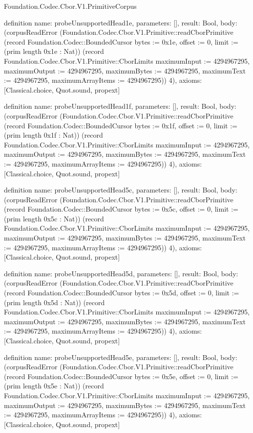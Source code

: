 \begin{lexlean}{Foundation.Codec.Cbor.V1.PrimitiveCorpus}
\begin{semanticmodule}
definition{
  name: probeUnsupportedHead1e,
  parameters: [],
  result: Bool,
  body: (corpusReadError (Foundation.Codec.Cbor.V1.Primitive::readCborPrimitive (record Foundation.Codec::BoundedCursor {bytes := 0x1e, offset := 0, limit := (prim length 0x1e : Nat)}) (record Foundation.Codec.Cbor.V1.Primitive::CborLimits {maximumInput := 4294967295, maximumOutput := 4294967295, maximumBytes := 4294967295, maximumText := 4294967295, maximumArrayItems := 4294967295})) 4),
  axioms: [Classical.choice, Quot.sound, propext]
}

definition{
  name: probeUnsupportedHead1f,
  parameters: [],
  result: Bool,
  body: (corpusReadError (Foundation.Codec.Cbor.V1.Primitive::readCborPrimitive (record Foundation.Codec::BoundedCursor {bytes := 0x1f, offset := 0, limit := (prim length 0x1f : Nat)}) (record Foundation.Codec.Cbor.V1.Primitive::CborLimits {maximumInput := 4294967295, maximumOutput := 4294967295, maximumBytes := 4294967295, maximumText := 4294967295, maximumArrayItems := 4294967295})) 4),
  axioms: [Classical.choice, Quot.sound, propext]
}

definition{
  name: probeUnsupportedHead5c,
  parameters: [],
  result: Bool,
  body: (corpusReadError (Foundation.Codec.Cbor.V1.Primitive::readCborPrimitive (record Foundation.Codec::BoundedCursor {bytes := 0x5c, offset := 0, limit := (prim length 0x5c : Nat)}) (record Foundation.Codec.Cbor.V1.Primitive::CborLimits {maximumInput := 4294967295, maximumOutput := 4294967295, maximumBytes := 4294967295, maximumText := 4294967295, maximumArrayItems := 4294967295})) 4),
  axioms: [Classical.choice, Quot.sound, propext]
}

definition{
  name: probeUnsupportedHead5d,
  parameters: [],
  result: Bool,
  body: (corpusReadError (Foundation.Codec.Cbor.V1.Primitive::readCborPrimitive (record Foundation.Codec::BoundedCursor {bytes := 0x5d, offset := 0, limit := (prim length 0x5d : Nat)}) (record Foundation.Codec.Cbor.V1.Primitive::CborLimits {maximumInput := 4294967295, maximumOutput := 4294967295, maximumBytes := 4294967295, maximumText := 4294967295, maximumArrayItems := 4294967295})) 4),
  axioms: [Classical.choice, Quot.sound, propext]
}

definition{
  name: probeUnsupportedHead5e,
  parameters: [],
  result: Bool,
  body: (corpusReadError (Foundation.Codec.Cbor.V1.Primitive::readCborPrimitive (record Foundation.Codec::BoundedCursor {bytes := 0x5e, offset := 0, limit := (prim length 0x5e : Nat)}) (record Foundation.Codec.Cbor.V1.Primitive::CborLimits {maximumInput := 4294967295, maximumOutput := 4294967295, maximumBytes := 4294967295, maximumText := 4294967295, maximumArrayItems := 4294967295})) 4),
  axioms: [Classical.choice, Quot.sound, propext]
}


\end{semanticmodule}
\end{lexlean}
